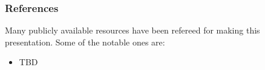\begin{frame}\frametitle{References}
Many publicly available resources have been refereed for making this presentation. Some of the notable ones are:
\small
\begin{itemize}
\item TBD
\end{itemize}
\end{frame}

